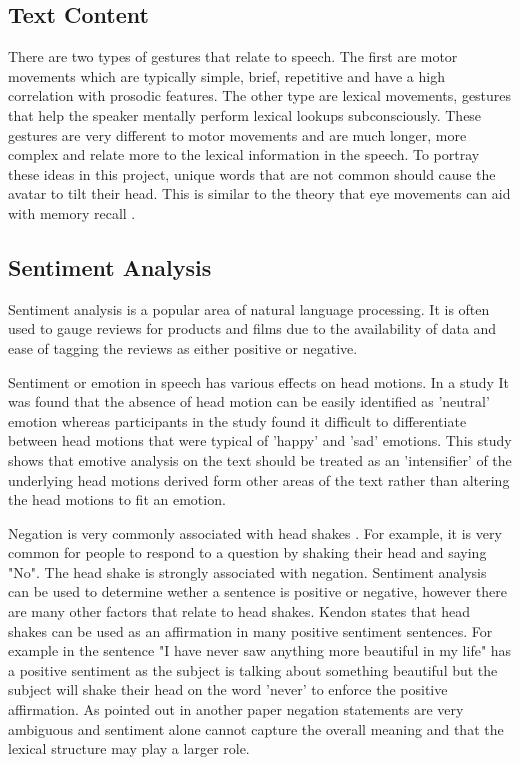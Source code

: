 \documentclass[bsc,frontabs,twoside,singlespacing,parskip,deptreport]{infthesis}
\begin{document}
\subsection{Text Content}

There are two types of gestures that relate to speech. \cite{lexical_gestures} The first are motor movements which are typically simple, brief, repetitive and have a high correlation with prosodic features. The other type are lexical movements, gestures that help the speaker mentally perform lexical lookups subconsciously. These gestures are very different to motor movements and are much longer, more complex and relate more to the lexical information in the speech. To portray these ideas in this project, unique words that are not common should cause the avatar to tilt their head. This is similar to the theory that eye movements can aid with memory recall \cite{eye_movements}.

\subsection{Sentiment Analysis}

Sentiment analysis is a popular area of natural language processing. It is often used to gauge reviews for products\cite{sentiment_online} and films\cite{sentiment_films} due to the availability of data and ease of tagging the reviews as either positive or negative.

Sentiment or emotion in speech has various effects on head motions. In a study It was found that the absence of head motion can be easily identified as 'neutral' emotion \cite{emotion_head_motion} whereas participants in the study found it difficult to differentiate between head motions that were typical of 'happy' and 'sad' emotions. This study shows that emotive analysis on the text should be treated as an 'intensifier' of the underlying head motions derived form other areas of the text rather than altering the head motions to fit an emotion.

Negation is very commonly associated with head shakes \cite{head_shaking}. For example, it is very common for people to respond to a question by shaking their head and saying "No". The head shake is strongly associated with negation. Sentiment analysis can be used to determine wether a sentence is positive or negative, however there are many other factors that relate to head shakes. Kendon states that head shakes can be used as an affirmation \cite{kendon} in many positive sentiment sentences. For example in the sentence "I have never saw anything more beautiful in my life" has a positive sentiment as the subject is talking about something beautiful but the subject will shake their head on the word 'never' to enforce the positive affirmation. As pointed out in another paper \cite{negative_sentiment} negation statements are very ambiguous and sentiment alone cannot capture the overall meaning and that the lexical structure may play a larger role.
\end{document}
